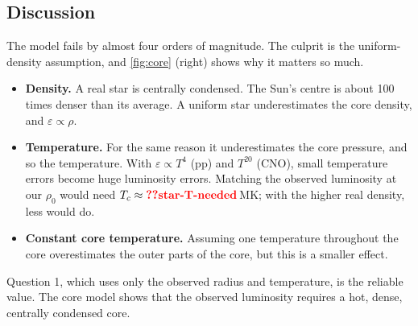 \documentclass[11pt,a4paper]{article}
\begin{document}
\subsection*{Discussion}
The model fails by almost four orders of magnitude.
The culprit is the uniform-density assumption, and \cref{fig:core} (right) shows why it matters so much.
\begin{itemize}
\item \textbf{Density.} A real star is centrally condensed. The Sun's centre is about 100 times denser than its average. A uniform star underestimates the core density, and $\varepsilon\propto\rho$.
\item \textbf{Temperature.} For the same reason it underestimates the core pressure, and so the temperature. With $\varepsilon\propto T^4$ (pp) and $T^{20}$ (CNO), small temperature errors become huge luminosity errors. Matching the observed luminosity at our $\rho_0$ would need $T_c\approx\val{star-T-needed}$\,MK; with the higher real density, less would do.
\item \textbf{Constant core temperature.} Assuming one temperature throughout the core overestimates the outer parts of the core, but this is a smaller effect.
\end{itemize}
Question 1, which uses only the observed radius and temperature, is the reliable value.
The core model shows that the observed luminosity requires a hot, dense, centrally condensed core.
\end{document}
